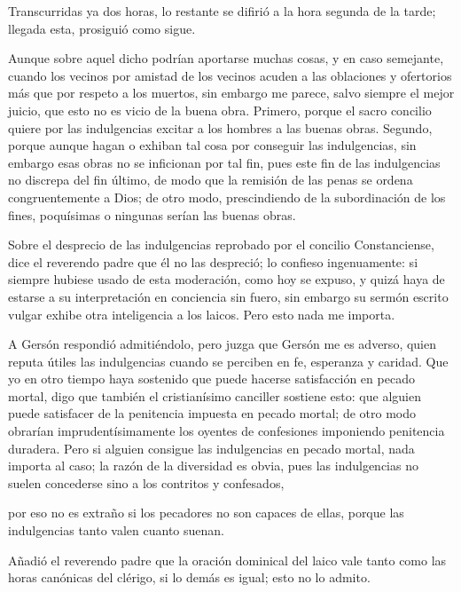 Transcurridas ya dos horas, lo restante se difirió a la hora segunda de la tarde; llegada esta, prosiguió como sigue.

Aunque sobre aquel dicho podrían aportarse muchas cosas, y en caso semejante, cuando los vecinos por amistad de los vecinos acuden a las oblaciones y ofertorios más que por respeto a los muertos, sin embargo me parece, salvo siempre el mejor juicio, que esto no es vicio de la buena obra. Primero, porque el sacro concilio quiere por las indulgencias excitar a los hombres a las buenas obras. Segundo, porque aunque hagan o exhiban tal cosa por conseguir las indulgencias, sin embargo esas obras no se inficionan por tal fin, pues este fin de las indulgencias no discrepa del fin último, de modo que la remisión de las penas se ordena congruentemente a Dios; de otro modo, prescindiendo de la subordinación de los fines, poquísimas o ningunas serían las buenas obras.

Sobre el desprecio de las indulgencias reprobado por el concilio Constanciense, dice el reverendo padre que él no las despreció; lo confieso ingenuamente: si siempre hubiese usado de esta moderación, como hoy se expuso, y quizá haya de estarse a su interpretación en conciencia sin fuero, sin embargo su sermón escrito vulgar exhibe otra inteligencia a los laicos. Pero esto nada me importa.

A Gersón respondió admitiéndolo, pero juzga que Gersón me es adverso, quien reputa útiles las indulgencias cuando se perciben en fe, esperanza y caridad. Que yo en otro tiempo haya sostenido que puede hacerse satisfacción en pecado mortal, digo que también el cristianísimo canciller sostiene esto: que alguien puede satisfacer de la penitencia impuesta en pecado mortal; de otro modo obrarían imprudentísimamente los oyentes de confesiones imponiendo penitencia duradera. Pero si alguien consigue las indulgencias en pecado mortal, nada importa al caso; la razón de la diversidad es obvia, pues las indulgencias no suelen concederse sino a los contritos y confesados,

por eso no es extraño si los pecadores no son capaces de ellas, porque las indulgencias tanto valen cuanto suenan.

Añadió el reverendo padre que la oración dominical del laico vale tanto como las horas canónicas del clérigo, si lo demás es igual; esto no lo admito.

